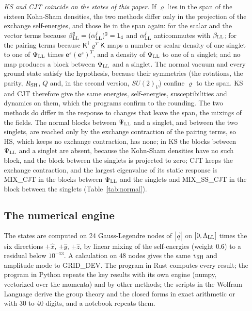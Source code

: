 \documentclass[aps,prd,onecolumn,superscriptaddress,nofootinbib,floatfix,longbibliography]{revtex4-2}
\newcommand{\LL}{{\rm LL}}
\newcommand{\SH}{{\rm SH}}
\begin{document}
\emph{KS and CJT coincide on the states of this paper.} If $\varrho$ lies in the span of the sixteen Kohn-Sham densities,
the two methods differ only in the projection of the exchange self-energies, and those lie in the span again: for the
scalar and the vector terms because $\beta_\LL^2=(\alpha^j_\LL)^2=\mathsf 1_4$ and $\alpha^j_\LL$ anticommutes with $\beta_\LL$;
for the pairing terms because $\mathsf K^\dagger\varrho^T\mathsf K$ maps a number or scalar density of one singlet to one of
$\Psi_\LL$ times $\mathbf e^s(\mathbf e^s)^T$, and a density of $\Psi_\LL$ to one of a singlet; and no map produces a block
between $\Psi_\LL$ and a singlet. The normal vacuum and every ground state satisfy the hypothesis, because their symmetries
(the rotations, the parity, $R_\SH$, $Q$ and, in the second version, $SU(2)_V$) confine $\varrho$ to the span. KS and CJT
therefore give the same energies, self-energies, susceptibilities and dynamics on them, which the programs confirm to the
rounding. The two methods do differ in the response to changes that leave the span, the mixings of the fields. The
normal blocks between $\Psi_\LL$ and a singlet, and between the two singlets, are reached only by the exchange contraction
of the pairing terms, so HS, which keeps no exchange contraction, has none; in KS the blocks between $\Psi_\LL$ and a
singlet are absent, because the Kohn-Sham densities have no such block, and the block between the singlets is projected
to zero; CJT keeps the exchange contraction, and the largest eigenvalue of its static response is {{MIX_CJT}} in the
blocks between $\Psi_\LL$ and the singlets and {{MIX_SS_CJT}} in the block between the singlets (Table~\ref{tab:normal}).

\subsection{The numerical engine}

The states are computed on 24 Gauss-Legendre nodes of $|\vec q|$ on $[0,\Lambda_\LL]$ times the six directions
$\pm\hat x$, $\pm\hat y$, $\pm\hat z$, by linear mixing of the self-energies (weight 0.6) to a residual below
$10^{-13}$. A calculation on 48 nodes gives the same $v_\SH$ and amplitude mode to {{GRID_DEV}}. The program in Rust
computes every result; the program in Python repeats the key results with its own engine (numpy, vectorized over the
momenta) and by other methods; the scripts in the Wolfram Language derive the group theory and the closed forms in exact
arithmetic or with 30 to 40 digits, and a notebook repeats them.
\end{document}

